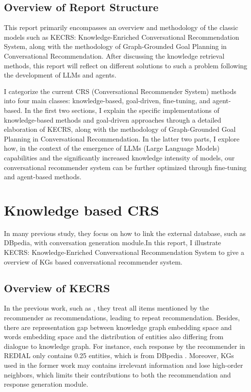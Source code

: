 \documentclass[11pt]{article}
\begin{document}
\subsection{Overview of Report Structure}
This report primarily encompasses an overview and methodology of the classic models such as KECRS: Knowledge-Enriched Conversational Recommendation System, along with the methodology of Graph-Grounded Goal Planning in Conversational Recommendation. After discussing the knowledge retrieval methods, this report will reflect on different solutions to such a problem following the development of LLMs and agents.

I categorize the current CRS (Conversational Recommender System) methods into four main classes: knowledge-based, goal-driven, fine-tuning, and agent-based. In the first two sections, I explain the specific implementations of knowledge-based methods and goal-driven approaches through a detailed elaboration of KECRS, along with the methodology of Graph-Grounded Goal Planning in Conversational Recommendation. In the latter two parts, I explore how, in the context of the emergence of LLMs (Large Language Models) capabilities and the significantly increased knowledge intensity of models, our conversational recommender system can be further optimized through fine-tuning and agent-based methods.



\section{Knowledge based CRS}
In many previous study, they focus on how to link the external database, such as DBpedia, with conversation generation module.In this report, I illustrate KECRS: Knowledge-Enriched Conversational Recommendation System \citet{zhangKECRSKnowledgeEnrichedConversational2021} to give a overview of KGs based conversational recommender system.

\subsection{Overview of KECRS}
In the previous work, such as \citet{chenKnowledgeBasedRecommenderDialog2019}, they treat all items mentioned by the recommender as recommendations, leading to repeat recommendation. Besides, there are representation gap between knowledge graph embedding space and words embedding space and the distribution of entities also differing from dialogue to knowledge graph. For instance, each response by the recommender in REDIAL only contains 0.25 entities, which is from DBpedia \citet{zhangKECRSKnowledgeEnrichedConversational2021}. Moreover, KGs used in the former work \citet{sarkar-etal-2020-suggest} may contains irrelevant information and lose high-order neighbors, which limits their contributions to both the recommendation and response generation module.
\end{document}
